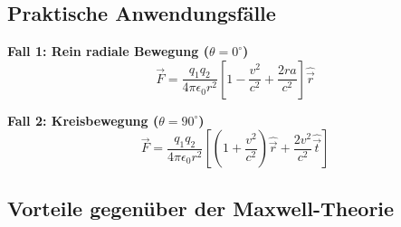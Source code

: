 \subsection{Praktische Anwendungsfälle}

\textbf{Fall 1: Rein radiale Bewegung ($\theta = 0^\circ$)}
\begin{equation}
\vec{F} = \frac{q_1 q_2}{4\pi\epsilon_0 r^2}\left[1 - \frac{v^2}{c^2} + \frac{2r a}{c^2}\right]\hat{\vec{r}}
\end{equation}

\textbf{Fall 2: Kreisbewegung ($\theta = 90^\circ$)}
\begin{equation}
\vec{F} = \frac{q_1 q_2}{4\pi\epsilon_0 r^2}\left[\left(1 + \frac{v^2}{c^2}\right)\hat{\vec{r}} + \frac{2v^2}{c^2}\hat{\vec{t}}\right]
\end{equation}

\subsection{Vorteile gegenüber der Maxwell-Theorie}


